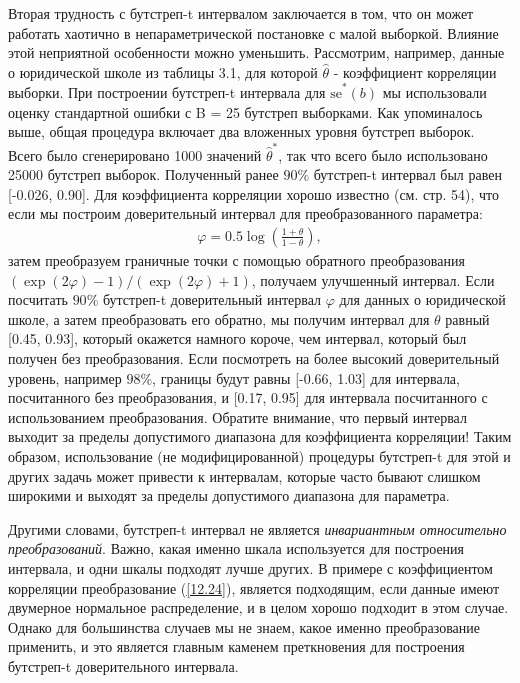 Вторая трудность с бутстреп-t интервалом заключается в том, что он может работать хаотично в непараметрической постановке с малой выборкой. Влияние этой неприятной особенности можно уменьшить. Рассмотрим, например, данные о юридической школе из таблицы 3.1, для которой  $\widehat{\theta}$ - коэффициент корреляции выборки. При построении бутстреп-t интервала для $\widehat{\text{se}}^{*}(b)$ мы использовали оценку стандартной ошибки с B = 25 бутстреп выборками. Как упоминалось выше, общая процедура включает два вложенных уровня бутстреп выборок. Всего было сгенерировано 1000 значений  $\widehat{\theta}^{*}$, так что всего было использовано 25000 бутстреп выборок. Полученный ранее $90 \%$ бутстреп-t интервал был равен [-0.026, 0.90]. Для коэффициента корреляции хорошо известно (см. стр. 54), что если мы построим доверительный интервал для преобразованного параметра:
\begin{gather}\label{12.24}
\varphi = 0.5 \log(\frac{1+\theta}{1 - \theta}),
\end{gather}
затем преобразуем граничные точки с помощью обратного преобразования $(\exp(2\varphi) - 1)/(\exp(2\varphi) + 1)$, получаем улучшенный интервал. Если посчитать $90\%$ бутстреп-t доверительный интервал $\varphi$ для данных о юридической школе, а затем преобразовать его обратно, мы получим интервал для $\theta$ равный [0.45, 0.93], который окажется намного короче, чем интервал, который был получен без преобразования. Если посмотреть на более высокий доверительный уровень, например $ 98\% $, границы будут равны [-0.66, 1.03] для интервала, посчитанного без преобразования, и [0.17, 0.95] для интервала посчитанного с использованием преобразования. Обратите внимание, что первый интервал выходит за пределы допустимого диапазона для коэффициента корреляции! Таким образом, использование (не модифицированной) процедуры бутстреп-t для этой и других задачь может привести к интервалам, которые часто бывают слишком широкими и выходят за пределы допустимого диапазона для параметра. 

Другими словами, бутстреп-t интервал не является \textit{инвариантным относительно преобразований}. Важно, какая именно шкала используется для построения интервала, и одни шкалы подходят лучше других. В примере с коэффициентом корреляции преобразование (\ref{12.24}), является подходящим, если данные имеют двумерное нормальное распределение, и в целом хорошо подходит в этом случае. Однако для большинства случаев мы не знаем, какое именно преобразование применить, и это является главным каменем преткновения для построения бутстреп-t доверительного интервала.

